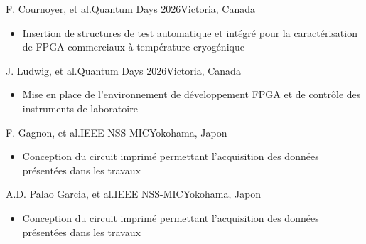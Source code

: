 
{F. Cournoyer, et al.}{Quantum Days 2026}{Victoria, Canada}
{\vspace{-12pt}
\begin{itemize}
    \item Insertion de structures de test automatique et intégré pour la caractérisation de FPGA commerciaux à température cryogénique
\end{itemize}}

{J. Ludwig, et al.}{Quantum Days 2026}{Victoria, Canada}
{\vspace{-12pt}
\begin{itemize}
    \item Mise en place de l'environnement de développement FPGA et de contrôle des instruments de laboratoire
\end{itemize}}

{F. Gagnon, et al.}{IEEE NSS-MIC}{Yokohama, Japon}
{\vspace{-12pt}
\begin{itemize}
    \item Conception du circuit imprimé permettant l'acquisition des données présentées dans les travaux
\end{itemize}}

{A.D. Palao Garcia, et al.}{IEEE NSS-MIC}{Yokohama, Japon}
{\vspace{-12pt}
\begin{itemize}
    \item Conception du circuit imprimé permettant l'acquisition des données présentées dans les travaux
\end{itemize}}

